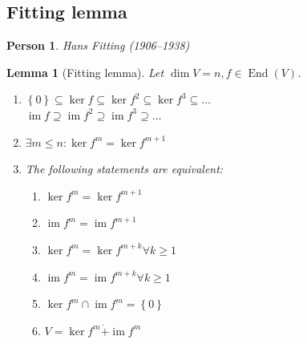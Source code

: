 \documentclass{article}
\newcounter{lecref}[section]
\numberwithin{lecref}{section}
\newtheorem{lemma}[lecref]{Lemma}
\newtheorem*{person}{Person}
\newcommand{\set}[1]{\left\{#1\right\}}
\DeclareMathOperator{\im}{im}
\begin{document}
\subsection{Fitting lemma}

\begin{person}
  Hans Fitting (1906--1938)
\end{person}

\begin{lemma}[Fitting lemma]
  Let $\dim{V} = n, f \in \operatorname{End}(V)$.
  \begin{enumerate}
    \item $\set{0} \subseteq \ker{f} \subseteq \ker{f^2} \subseteq \ker{f^3} \subseteq \dots$ \\
          $\im{f} \supseteq \im{f^2} \supseteq \im{f^3} \supseteq \dots$
    \item $\exists m \leq n: \ker{f^m} = \ker{f^{m+1}}$
    \item The following statements are equivalent:
      \begin{enumerate}
        \item $\ker{f^m} = \ker{f^{m+1}}$
        \item $\im{f^m} = \im{f^{m+1}}$
        \item $\ker{f^m} = \ker{f^{m+k}} \forall k \geq 1$
        \item $\im{f^m} = \im{f^{m+k}} \forall k \geq 1$
        \item $\ker{f^m} \cap \im{f^m} = \set{0}$
        \item $V = \ker{f^m} \dot{+} \im{f^m}$
      \end{enumerate}
  \end{enumerate}
\end{lemma}
\end{document}
